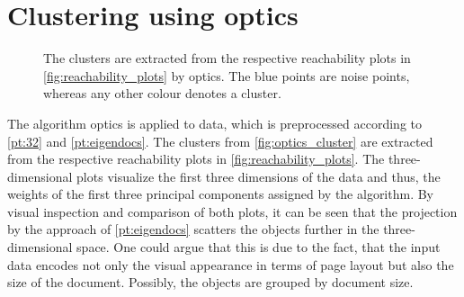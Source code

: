 \section{Clustering using \acs{optics}}\label{sec:evaluation-OPTICS}
\begin{figure}[!htb]%
    \centering
    \qquad
    \caption[\ac{optics} clusters]{The clusters are extracted from the respective reachability plots in \autoref{fig:reachability_plots} by \ac{optics}.
    The blue points are noise points, whereas any other colour denotes a cluster.}%
    \label{fig:optics_cluster}%
\end{figure}

The algorithm \ac{optics} is applied to data, which is preprocessed according to \autoref{pt:32} and \autoref{pt:eigendocs}.
The clusters from \autoref{fig:optics_cluster} are extracted from the respective reachability plots in \autoref{fig:reachability_plots}.
The three-dimensional plots visualize the first three dimensions of the data and thus, the weights of the first three principal components assigned by the \eigendocs{} algorithm.
By visual inspection and comparison of both plots, 
it can be seen that the projection by the \eigendocs{} approach of \autoref{pt:eigendocs} scatters the objects further in the three-dimensional space.
One could argue that this is due to the fact, 
that the input data encodes not only the visual appearance in terms of page layout but also the size of the document.
Possibly, the objects are grouped by document size.


